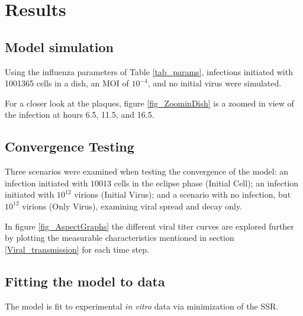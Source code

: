 
\section{Results}

\subsection{Model simulation}

Using the influenza parameters of Table \ref{tab_params}, infections initiated with 1001365 cells in a dish, an MOI of $10^{-4}$, and no initial virus were simulated. 

For a closer look at the plaques, figure \ref{fig_ZoominDish} is a zoomed in view of the infection at hours 6.5, 11.5, and 16.5. 

\subsection{Convergence Testing}

Three scenarios were examined when testing the convergence of the model: an infection initiated with $10013$ cells in the eclipse phase (Initial Cell); an infection initiated with $10^{12}$ virions (Initial Virus); and a scenario with no infection, but $10^{12}$ virions (Only Virus), examining viral spread and decay only. 

In figure \ref{fig_AspectGraphs} the different viral titer curves are explored further by plotting the measurable characteristics mentioned in section \ref{Viral_transmission} for each time step. 

\subsection{Fitting the model to data}

The model is fit to experimental \emph{in vitro} data \citep{pinilla12} via minimization of the SSR. 




